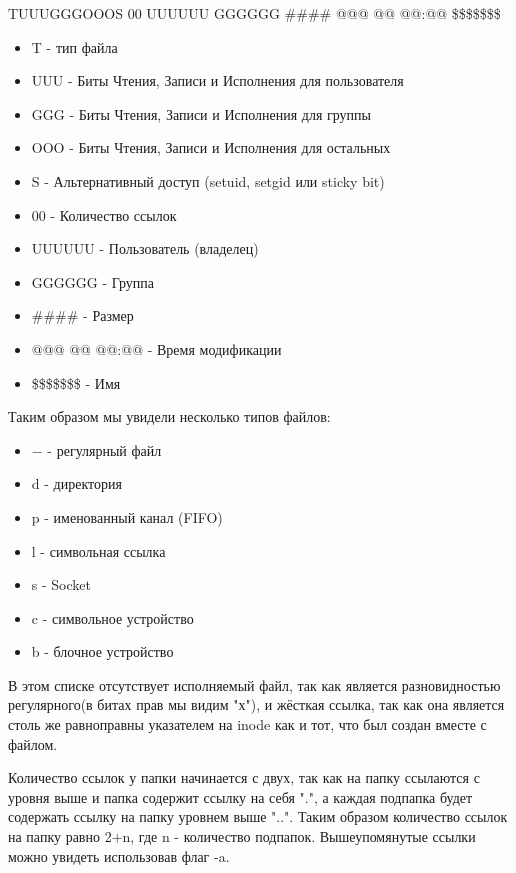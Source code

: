 \documentclass[a4paper]{article}
\begin{document}
TUUUGGGOOOS   00  UUUUUU GGGGGG \#\#\#\# @@@ @@ @@:@@  \$\$\$\$\$\$\$ 
\begin{itemize}
\item T - тип файла
\item UUU - Биты Чтения, Записи и Исполнения для пользователя
\item GGG - Биты Чтения, Записи и Исполнения для группы
\item OOO - Биты Чтения, Записи и Исполнения для остальных
\item S - Альтернативный доступ (setuid, setgid или sticky bit)
\item 00 - Количество ссылок
\item UUUUUU - Пользователь (владелец)
\item GGGGGG - Группа
\item \#\#\#\# - Размер
\item @@@ @@ @@:@@ - Время модификации
\item \$\$\$\$\$\$\$ - Имя
\end{itemize}

Таким образом мы увидели несколько типов файлов:
\begin{itemize}
\item $-$ - регулярный файл
\item d - директория
\item p - именованный канал (FIFO)
\item l - символьная ссылка
\item s - Socket
\item c - символьное устройство
\item b - блочное устройство
\end{itemize}
В этом списке отсутствует исполняемый файл, так как является разновидностью регулярного(в битах прав мы видим "х"), и жёсткая ссылка, так как она является столь же равноправны указателем на inode как и тот, что был создан вместе с файлом.

Количество ссылок у папки начинается с двух, так как на папку ссылаются с уровня выше и папка содержит ссылку на себя ".", а каждая подпапка будет содержать ссылку на папку уровнем выше "..". Таким образом количество ссылок на папку равно 2+n, где n - количество подпапок. Вышеупомянутые ссылки можно увидеть использовав флаг -a.


\end{document}
